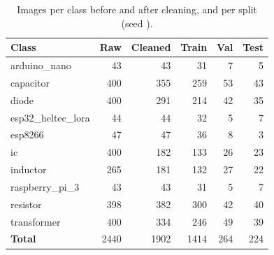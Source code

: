 \begin{table}[H]\centering\small
\caption{Images per class before and after cleaning, and per split (seed \Seed).}\label{tab:dataset}
\begin{tabular}{lrrrrr}\toprule
Class & Raw & Cleaned & Train & Val & Test \\\midrule
arduino\_nano & 43 & 43 & 31 & 7 & 5 \\
capacitor & 400 & 355 & 259 & 53 & 43 \\
diode & 400 & 291 & 214 & 42 & 35 \\
esp32\_heltec\_lora & 44 & 44 & 32 & 5 & 7 \\
esp8266 & 47 & 47 & 36 & 8 & 3 \\
ic & 400 & 182 & 133 & 26 & 23 \\
inductor & 265 & 181 & 132 & 27 & 22 \\
raspberry\_pi\_3 & 43 & 43 & 31 & 5 & 7 \\
resistor & 398 & 382 & 300 & 42 & 40 \\
transformer & 400 & 334 & 246 & 49 & 39 \\
\midrule
\textbf{Total} & 2440 & 1902 & 1414 & 264 & 224 \\
\bottomrule\end{tabular}\end{table}